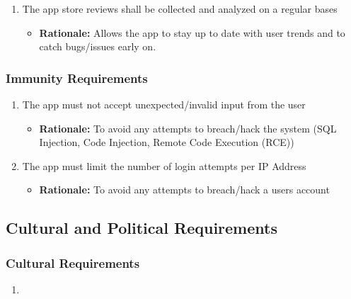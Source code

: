 \documentclass[]{article}
\begin{document}
\begin{enumerate}
\begin{enumerate}[{SR-AU}1. ]
\item The app store reviews shall be collected and analyzed on a regular bases
    \begin{itemize}
        \item \textbf{Rationale:} Allows the app to stay up to date with user trends and to catch bugs/issues early on.
    \end{itemize}
\end{enumerate}

\subsubsection{Immunity Requirements}
\label{ssub:immunity_requirements}
\begin{enumerate}[{SR-IM}1. ]
\item The app must not accept unexpected/invalid input from the user
    \begin{itemize}
        \item \textbf{Rationale:} To avoid any attempts to breach/hack the system (SQL Injection, Code Injection, Remote Code Execution (RCE))
    \end{itemize}
    
\item The app must limit the number of login attempts per IP Address
    \begin{itemize}
        \item \textbf{Rationale:} To avoid any attempts to breach/hack a users account
    \end{itemize}
\end{enumerate}


\subsection{Cultural and Political Requirements}
\label{sub:cultural_and_political_requirements}

\subsubsection{Cultural Requirements}
\label{ssub:cultural_requirements}
\begin{enumerate}[{CP-C}1. ]
	\item 
\end{enumerate}


\end{enumerate}
\end{document}
